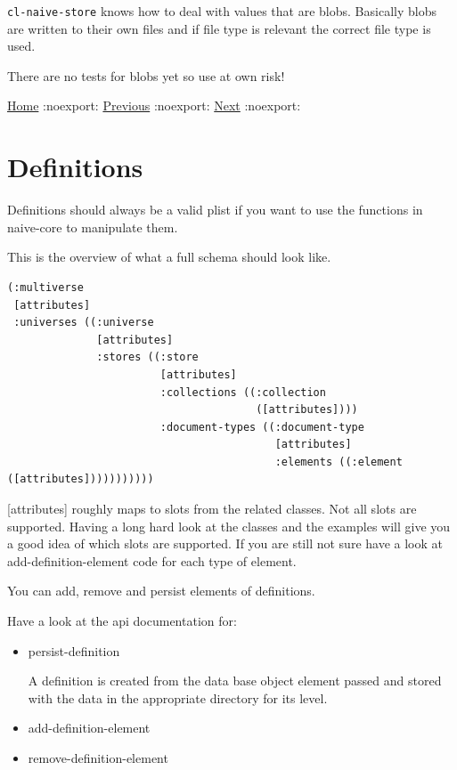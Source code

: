 \documentclass[11pt]{article}
\begin{document}
\texttt{cl-naive-store} knows how to deal with values that are blobs. Basically
blobs are written to their own files and if file type is relevant the
correct file type is used.

There are no tests for blobs yet so use at own risk!

\href{home.org}{Home} :noexport: \href{releases.org}{Previous} :noexport: \href{examples.org}{Next} :noexport:
\section{Definitions}
\label{sec:org86ff536}

Definitions should always be a valid plist if you want to use the
functions in naive-core to manipulate them.

This is the overview of what a full schema should look like.

\begin{verbatim}
(:multiverse
 [attributes]
 :universes ((:universe
              [attributes]
              :stores ((:store
                        [attributes]
                        :collections ((:collection
                                       ([attributes])))
                        :document-types ((:document-type
                                          [attributes]
                                          :elements ((:element ([attributes]))))))))))
\end{verbatim}

[attributes] roughly maps to slots from the related classes. Not all
slots are supported. Having a long hard look at the classes and the
examples will give you a good idea of which slots are supported. If
you are still not sure have a look at add-definition-element code for
each type of element.

You can add, remove and persist elements of definitions.

Have a look at the api documentation for:

\begin{itemize}
\item persist-definition

A definition is created from the data base object element passed and
stored with the data in the appropriate directory for its level.

\item add-definition-element
\item remove-definition-element
\end{itemize}
\end{document}
